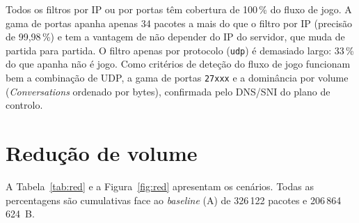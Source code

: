 \documentclass[a4paper,11pt]{article}
\begin{document}
Todos os filtros por IP ou por portas têm cobertura de 100\,\% do fluxo de jogo. A gama de portas apanha apenas 34 pacotes
a mais do que o filtro por IP (precisão de 99,98\,\%) e tem a vantagem de não depender do IP do servidor, que muda de partida
para partida. O filtro apenas por protocolo (\texttt{udp}) é demasiado largo: 33\,\% do que apanha não é jogo.
Como critérios de deteção do fluxo de jogo funcionam bem a combinação de UDP, a gama de portas \texttt{27xxx} e a
dominância por volume (\emph{Conversations} ordenado por bytes), confirmada pelo DNS/SNI do plano de controlo.

\section{Redução de volume}
A Tabela~\ref{tab:red} e a Figura~\ref{fig:red} apresentam os cenários. Todas as percentagens são cumulativas face ao
\emph{baseline} (A) de 326\,122 pacotes e 206\,864\,624~B.
\end{document}
